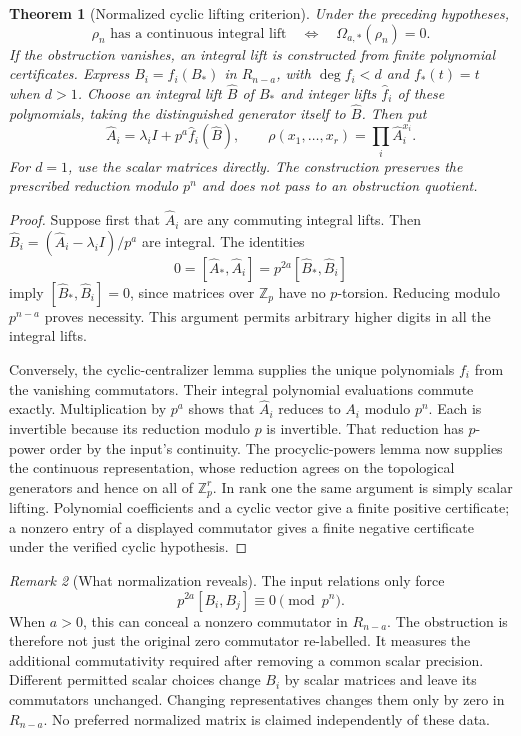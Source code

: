 \documentclass[11pt]{article}
\newtheorem{theorem}{Theorem}[section]
\theoremstyle{definition}
\theoremstyle{remark}
\newtheorem{remark}[theorem]{Remark}
\begin{document}
\begin{theorem}[Normalized cyclic lifting criterion]\label{thm:normalized-cyclic-lift}
Under the preceding hypotheses,
\[
 \boxed{\rho_n\text{ has a continuous integral lift}
 \quad\Longleftrightarrow\quad\Omega_{a,*}(\rho_n)=0.}
\]
If the obstruction vanishes, an integral lift is constructed from finite polynomial certificates. Express $B_i=f_i(B_*)$ in $R_{n-a}$, with $\deg f_i<d$ and $f_*(t)=t$ when $d>1$. Choose an integral lift $\widehat B$ of $B_*$ and integer lifts $\widehat f_i$ of these polynomials, taking the distinguished generator itself to $\widehat B$. Then put
\[
 \widehat A_i=\lambda_i I+p^a\widehat f_i(\widehat B),
 \qquad
 \rho(x_1,\ldots,x_r)=\prod_i\widehat A_i^{x_i}.
\]
For $d=1$, use the scalar matrices directly. The construction preserves the prescribed reduction modulo $p^n$ and does not pass to an obstruction quotient.
\end{theorem}
\begin{proof}
Suppose first that $\widehat A_i$ are any commuting integral lifts. Then
$\widehat B_i=(\widehat A_i-\lambda_iI)/p^a$ are integral. The identities
\[
 0=[\widehat A_*,\widehat A_i]
   =p^{2a}[\widehat B_*,\widehat B_i]
\]
imply $[\widehat B_*,\widehat B_i]=0$, since matrices over $\mathbb Z_p$ have no $p$-torsion. Reducing modulo $p^{n-a}$ proves necessity. This argument permits arbitrary higher digits in all the integral lifts.

Conversely, the cyclic-centralizer lemma supplies the unique polynomials $f_i$ from the vanishing commutators. Their integral polynomial evaluations commute exactly. Multiplication by $p^a$ shows that $\widehat A_i$ reduces to $A_i$ modulo $p^n$. Each is invertible because its reduction modulo $p$ is invertible. That reduction has $p$-power order by the input's continuity. The procyclic-powers lemma now supplies the continuous representation, whose reduction agrees on the topological generators and hence on all of $\mathbb Z_p^r$. In rank one the same argument is simply scalar lifting. Polynomial coefficients and a cyclic vector give a finite positive certificate; a nonzero entry of a displayed commutator gives a finite negative certificate under the verified cyclic hypothesis.
\end{proof}

\begin{remark}[What normalization reveals]
The input relations only force
\[
 p^{2a}[B_i,B_j]\equiv0\pmod{p^n}.
\]
When $a>0$, this can conceal a nonzero commutator in $R_{n-a}$. The obstruction is therefore not just the original zero commutator re-labelled. It measures the additional commutativity required after removing a common scalar precision. Different permitted scalar choices change $B_i$ by scalar matrices and leave its commutators unchanged. Changing representatives changes them only by zero in $R_{n-a}$. No preferred normalized matrix is claimed independently of these data.
\end{remark}
\end{document}
